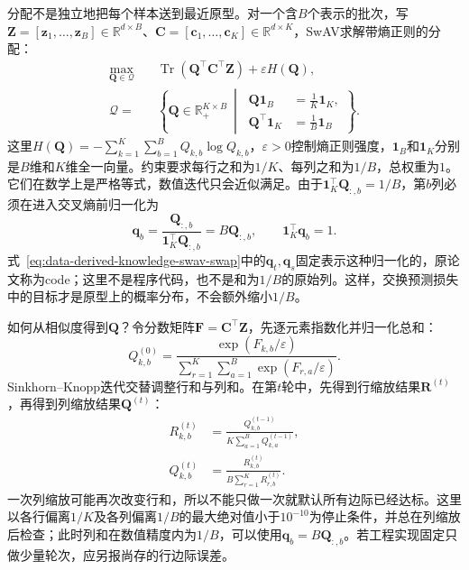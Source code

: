 分配不是独立地把每个样本送到最近原型。对一个含$B$个表示的批次，写$\bm{Z}=[\bm{z}_1,\ldots,\bm{z}_B]\in\mathbb{R}^{d\times B}$、$\bm{C}=[\bm{c}_1,\ldots,\bm{c}_K]\in\mathbb{R}^{d\times K}$，SwAV求解带熵正则的分配：
\begin{align}
  \max_{\bm{Q}\in\mathcal{Q}}\quad&
  \operatorname{Tr}(\bm{Q}^{\top}\bm{C}^{\top}\bm{Z})
  +\varepsilon H(\bm{Q}),\\
  \mathcal{Q}
  ={}&
  \left\{
    \bm{Q}\in\mathbb{R}_{+}^{K\times B}
    \ \middle|\
    \begin{aligned}
      \bm{Q}\bm{1}_B&=\frac{1}{K}\bm{1}_K,\\
      \bm{Q}^{\top}\bm{1}_K&=\frac{1}{B}\bm{1}_B
    \end{aligned}
  \right\}.
  \label{eq:data-derived-knowledge-swav-assignment}
\end{align}
这里$H(\bm{Q})=-\sum_{k=1}^{K}\sum_{b=1}^{B}Q_{k,b}\log Q_{k,b}$，$\varepsilon>0$控制熵正则强度，$\bm{1}_B$和$\bm{1}_K$分别是$B$维和$K$维全一向量。约束要求每行之和为$1/K$、每列之和为$1/B$，总权重为$1$。它们在数学上是严格等式，数值迭代只会近似满足。由于$\bm{1}_K^{\top}\bm{Q}_{:,b}=1/B$，第$b$列必须在进入交叉熵前归一化为
\begin{equation}
  \bm{q}_b
  =
  \frac{\bm{Q}_{:,b}}
       {\bm{1}_K^{\top}\bm{Q}_{:,b}}
  =
  B\bm{Q}_{:,b},
  \qquad
  \bm{1}_K^{\top}\bm{q}_b=1.
  \label{eq:data-derived-knowledge-swav-code-normalization}
\end{equation}
式~\eqref{eq:data-derived-knowledge-swav-swap}中的$\bm{q}_t,\bm{q}_s$固定表示这种归一化的，原论文称为code；这里不是程序代码，也不是和为$1/B$的原始列。这样，交换预测损失中的目标才是原型上的概率分布，不会额外缩小$1/B$。

如何从相似度得到$\bm{Q}$？令分数矩阵$\bm{F}=\bm{C}^{\top}\bm{Z}$，先逐元素指数化并归一化总和：
\[
  Q_{k,b}^{(0)}
  =\frac{\exp(F_{k,b}/\varepsilon)}
  {\sum_{r=1}^{K}\sum_{a=1}^{B}\exp(F_{r,a}/\varepsilon)}.
\]
Sinkhorn--Knopp迭代交替调整行和与列和。在第$t$轮中，先得到行缩放结果$\bm{R}^{(t)}$，再得到列缩放结果$\bm{Q}^{(t)}$：
\begin{equation}
  \begin{aligned}
    R_{k,b}^{(t)}
    &=\frac{Q_{k,b}^{(t-1)}}{K\sum_{a=1}^{B}Q_{k,a}^{(t-1)}},\\
    Q_{k,b}^{(t)}
    &=\frac{R_{k,b}^{(t)}}{B\sum_{r=1}^{K}R_{r,b}^{(t)}}.
  \end{aligned}
  \label{eq:data-derived-knowledge-sinkhorn-scaling}
\end{equation}
一次列缩放可能再次改变行和，所以不能只做一次就默认所有边际已经达标。这里以各行偏离$1/K$及各列偏离$1/B$的最大绝对值小于$10^{-10}$为停止条件，并总在列缩放后检查；此时列和在数值精度内为$1/B$，可以使用$\bm{q}_b=B\bm{Q}_{:,b}$。若工程实现固定只做少量轮次，应另报尚存的行边际误差。

